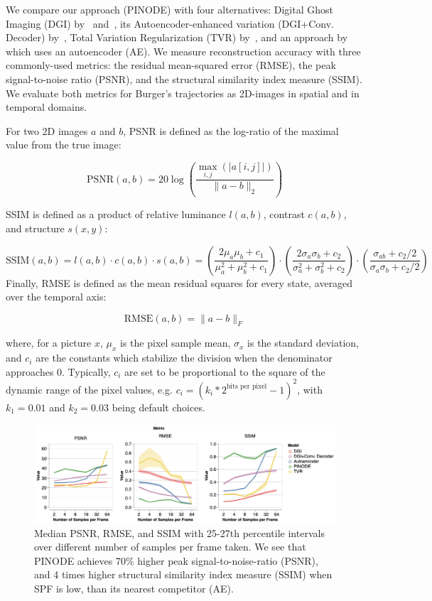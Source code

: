 We compare our approach (PINODE) with four alternatives: Digital Ghost Imaging (DGI) by~\cite{ferri2010differential} and~\cite{gong2010method}, its Autoencoder-enhanced variation (DGI+Conv. Decoder) by~\cite{wang2022single}, Total Variation Regularization  (TVR) by~\cite{bian2018experimental}, and an approach by~\cite{bora2017compressed} which uses an autoencoder (AE). We measure reconstruction accuracy with three commonly-used metrics: the residual mean-squared error (RMSE), the peak signal-to-noise ratio (PSNR), and the structural similarity index measure (SSIM). We evaluate both metrics for Burger's trajectories as 2D-images in spatial and in temporal domains. 

For two 2D images $a$ and $b$, PSNR is defined as the log-ratio of the maximal value from the true image:

\[
	\text{PSNR}(a, b) = 20\log\left(\frac{\max_{i,j}(|a[i,j]|)}{\|a - b\|_2}\right)
\]

SSIM is defined as a product of relative luminance $l(a,b)$, contrast $c(a,b)$, and structure $s(x,y)$:

\[
	\text{SSIM}(a, b) = l(a,b) \cdot c(a,b) \cdot s(a,b) = \left(\frac{2\mu_a\mu_b + c_1}{\mu_a^2 + \mu_b^2 + c_1}\right) \cdot \left(\frac{2\sigma_a\sigma_b + c_2}{\sigma_a^2 + \sigma_b^2 + c_2} \right) \cdot \left(\frac{\sigma_{ab} + c_2/2}{\sigma_a \sigma_b + c_2/2}\right)
\]
Finally, RMSE is defined as the mean residual squares for every state, averaged over the temporal axis:

\[
	\text{RMSE}(a,b) = \|a - b\|_F
\] 

where, for a picture $x$, $\mu_x$ is the pixel sample mean, $\sigma_x$ is the standard deviation,  and $c_i$ are the constants which stabilize the division when the denominator approaches 0. Typically, $c_i$ are set to be proportional to the square of the dynamic range of the pixel values, e.g.  $c_i = (k_i*2^{\text{bits per pixel}} - 1)^2$, with $k_1 = 0.01$ and $k_2 = 0.03$ being default choices.


\begin{figure}
    \centering
    \includegraphics[width=\textwidth]{figures/cs_burgers_psnr.png}
    \caption{\label{fig:cs_burgers_spf} Median PSNR, RMSE, and SSIM with 25-27th percentile intervals over different number of samples per frame taken. We see that PINODE achieves 70\% higher peak signal-to-noise-ratio (PSNR), and 4 times higher structural similarity index measure (SSIM) when SPF is low, than its nearest competitor (AE).}
    
\end{figure}

